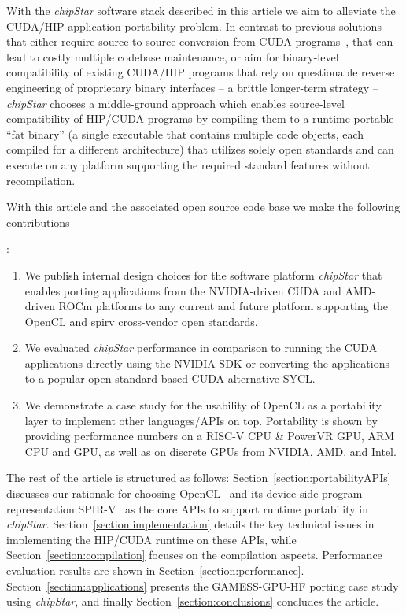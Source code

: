\documentclass[Afour,sageh,times]{sagej}
\newcounter{notelabelcount}
\newcommand{\myendnote}[1]{%
   \addtocounter{notelabelcount}{1}%
   \hyperref[notelabel\thenotelabelcount]{%
   \endnote{%
      \addtocounter{notelabelcount}{1}%
      \phantomsection\label{notelabel\thenotelabelcount}%
      {#1}%
   }}%
}
\newcommand{\chipstar}{\textit{chipStar}\xspace}
\newcommand{\mycite}[1]{\citep{#1}}
\begin{document}
With the \chipstar software stack described in this article we aim to alleviate the CUDA/HIP application
portability problem. In contrast to previous solutions that either require source-to-source conversion from CUDA programs~\mycite{SYCLomatic}, that can lead to costly multiple codebase maintenance, or aim for binary-level compatibility of existing CUDA/HIP programs that rely on questionable reverse engineering of proprietary binary interfaces -- a brittle longer-term strategy -- \chipstar chooses a middle-ground approach which enables source-level compatibility of HIP/CUDA programs by compiling them to a runtime portable ``fat binary'' (a single executable that contains multiple code objects, each compiled for a different architecture)  that utilizes solely open standards and can execute on any platform supporting the required standard features without recompilation.

With this article and the associated open source code base we make the following contributions\myendnote{See Section~\ref{\acronymtype} for an Acronym Table.}:

\begin{enumerate}
  \item We publish internal design choices for the software platform \chipstar that enables porting applications from the NVIDIA-driven CUDA and AMD-driven ROCm platforms to any current and future platform supporting the OpenCL and \acrshort{spirv} cross-vendor open standards.
  \item We evaluated \chipstar performance in comparison to running the CUDA applications directly using the NVIDIA SDK or converting the applications to a popular open-standard-based CUDA alternative SYCL.
  \item We demonstrate a case study for the usability of OpenCL as a portability layer to implement other languages/APIs on top. Portability is shown by providing performance numbers on a RISC-V CPU \& PowerVR GPU,  ARM CPU and GPU, as well as on discrete GPUs from NVIDIA, AMD, and Intel. 
\end{enumerate}

The rest of the article is structured as follows: Section~\ref{section:portabilityAPIs} discusses our rationale for choosing OpenCL~\mycite{OpenCL} and its device-side program representation SPIR-V~\mycite{SPIRV} as the core APIs to support runtime portability in \chipstar.
Section~\ref{section:implementation} details the key technical issues in implementing the HIP/CUDA runtime on these APIs, while Section~\ref{section:compilation} focuses on the compilation aspects. Performance evaluation results are shown in Section~\ref{section:performance}. 
Section~\ref{section:applications} presents the GAMESS-GPU-HF porting case study using \chipstar, and finally Section~\ref{section:conclusions} concludes the article.
\end{document}

